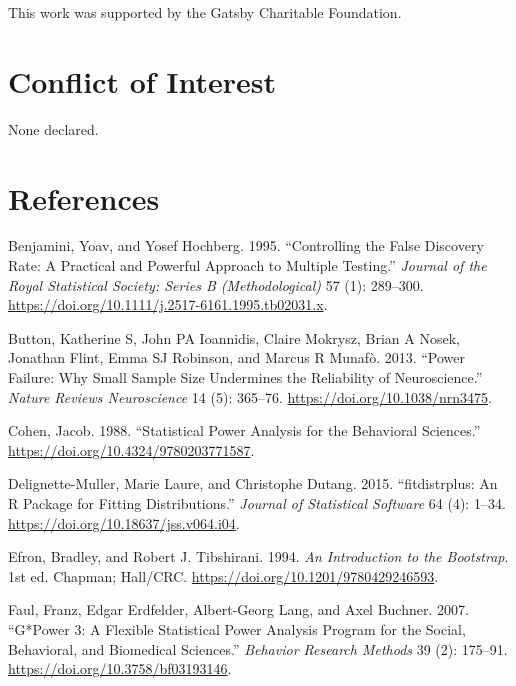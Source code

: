 \documentclass[
]{article}
\newlength{\cslhangindent}
\newenvironment{CSLReferences}[2] %
 {\begin{list}{}{%
  \setlength{\itemindent}{0pt}
  \setlength{\leftmargin}{0pt}
  \setlength{\parsep}{0pt}
  \ifodd #1
   \setlength{\leftmargin}{\cslhangindent}
   \setlength{\itemindent}{-1\cslhangindent}
  \fi
  \setlength{\itemsep}{#2\baselineskip}}}
 {\end{list}}
\begin{document}
This work was supported by the Gatsby Charitable Foundation.

\section{Conflict of Interest}\label{conflict-of-interest}

None declared.

\section*{References}\label{references}

\protect{}\label{refs}
\begin{CSLReferences}{1}{0}
Benjamini, Yoav, and Yosef Hochberg. 1995. {``Controlling the False
Discovery Rate: A Practical and Powerful Approach to Multiple
Testing.''} \emph{Journal of the Royal Statistical Society: Series B
(Methodological)} 57 (1): 289--300.
\url{https://doi.org/10.1111/j.2517-6161.1995.tb02031.x}.

Button, Katherine S, John PA Ioannidis, Claire Mokrysz, Brian A Nosek,
Jonathan Flint, Emma SJ Robinson, and Marcus R Munafò. 2013. {``Power
Failure: Why Small Sample Size Undermines the Reliability of
Neuroscience.''} \emph{Nature Reviews Neuroscience} 14 (5): 365--76.
\url{https://doi.org/10.1038/nrn3475}.

Cohen, Jacob. 1988. {``Statistical Power Analysis for the Behavioral
Sciences.''} \url{https://doi.org/10.4324/9780203771587}.

Delignette-Muller, Marie Laure, and Christophe Dutang. 2015.
{``{fitdistrplus}: An {R} Package for Fitting Distributions.''}
\emph{Journal of Statistical Software} 64 (4): 1--34.
\url{https://doi.org/10.18637/jss.v064.i04}.

Efron, Bradley, and Robert J. Tibshirani. 1994. \emph{An Introduction to
the Bootstrap}. 1st ed. Chapman; Hall/CRC.
\url{https://doi.org/10.1201/9780429246593}.

Faul, Franz, Edgar Erdfelder, Albert-Georg Lang, and Axel Buchner. 2007.
{``{G*Power} 3: A Flexible Statistical Power Analysis Program for the
Social, Behavioral, and Biomedical Sciences.''} \emph{Behavior Research
Methods} 39 (2): 175--91. \url{https://doi.org/10.3758/bf03193146}.


\end{CSLReferences}
\end{document}
